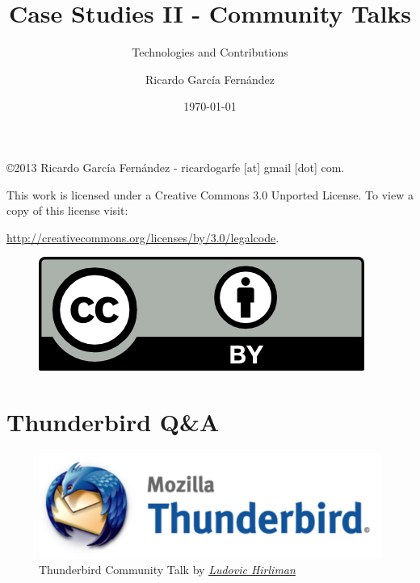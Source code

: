 \documentclass[11pt]{scrartcl}
\title{\textbf{Case Studies II - Community Talks}}
\subtitle{Technologies and Contributions}
\author{Ricardo Garc\'ia Fern\'andez}
\date{\today}
\begin{document}
\maketitle

\vfill

\begin{flushright}
    \copyright  2013 Ricardo Garc\'ia Fern\'andez - ricardogarfe [at] gmail [dot] com.

    This work is licensed under a Creative Commons 3.0 Unported License.
    To view a copy of this license visit:
 
    \url{http://creativecommons.org/licenses/by/3.0/legalcode}.
\end{flushright}

\begin{figure}[h]
    \begin{flushright}	
        \includegraphics{by}
        \label{fig:by}
    \end{flushright}
\end{figure}

\newpage

\tableofcontents

\newpage

\section{Thunderbird Q\&A}
\label{sec:thunderbird-qa}

\begin{figure}[H]
\centering
\includegraphics[width=\textwidth]{mozilla-thunderbird.png}   
\caption{Thunderbird Community Talk by \href{https://twitter.com/lhirlimann}{\emph{Ludovic Hirliman}}}
\label{thunderbird}
\end{figure}
\end{document}
